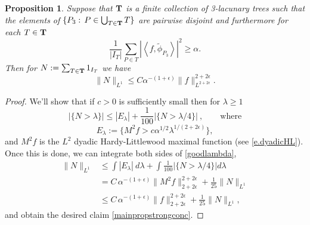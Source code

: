 \documentclass[12pt]{amsart}
\numberwithin{equation}{section}
\def\T{{\bf T}}
\def\<{\left<}
\def\>{\right>}
\newcommand {\tphi}{\tilde{\phi}}
\newtheorem{proposition}[theorem]{Proposition}
\begin{document}
\begin{proposition} \label{mainpropositionstrong} 
Suppose that $\T$ is a finite collection of 3-lacunary trees such that
the elements of $\{P_3:\, P\in \bigcup_{T \in \T} T\}$ are pairwise disjoint
and furthermore for each $T \in \T$
\begin{equation} \label{largesizeineq}
\frac{1}{|I_T|} \sum_{P \in T } |\<f,\tphi_{P_3}\>|^2 \geq \alpha.
\end{equation}
Then for $N := \sum_{T \in \T}1_{I_T}$ we have
\begin{equation} \label{mainpropstrongconc}
\|N\|_{L^1} \leq C  \alpha^{-(1+\epsilon)} \|f\|^{2 + 2\epsilon}_{L^{2 + 2\epsilon}}.
\end{equation}
\end{proposition}
\begin{proof}
We'll show that if $c>0$ is sufficiently small then for $\lambda \geq 1$ 
\begin{equation} \label{goodlambda}
|\{N > \lambda\}| \leq |E_\lambda| + \frac{1}{100} |\{N > \lambda/4\}|\ , \qquad \text{where}
\end{equation}
$$E_\lambda:=\{M^2 f > c \alpha^{1/2} \lambda^{1/(2 + 2\epsilon)}\},$$
and $M^2f$ is the $L^2$ dyadic Hardy-Littlewood maximal function (see \eqref{e.dyadicHL}). Once this is done, we can integrate both sides of \eqref{goodlambda},
\begin{align*}
\|N\|_{L^1} &\leq \int |E_\lambda| \ d\lambda + \int \frac{1}{100} |\{N > \lambda/4\}|  d\lambda   \\
&= C\, \alpha^{-(1 + \epsilon)}\|M^2 f \|_{2 + 2\epsilon}^{2 + 2\epsilon} + \frac{1}{25} \|N\|_{L^1} \\
&\leq  C\, \alpha^{-(1 + \epsilon)}\|f\|_{2 + 2\epsilon}^{2 + 2\epsilon} + \frac{1}{25} \|N\|_{L^1},
\end{align*}
and obtain the desired claim \eqref{mainpropstrongconc}.


\end{proof}
\end{document}
